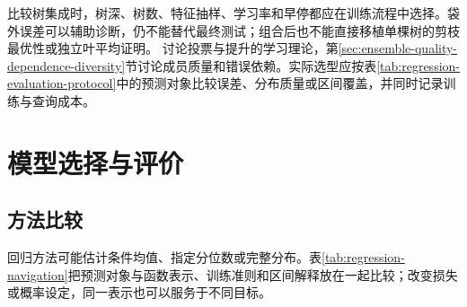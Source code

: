 比较树集成时，树深、树数、特征抽样、学习率和早停都应在训练流程中选择。袋外误差可以辅助诊断，仍不能替代最终测试；组合后也不能直接移植单棵树的剪枝最优性或独立叶平均证明。
讨论投票与提升的学习理论，第\ref{sec:ensemble-quality-dependence-diversity}节讨论成员质量和错误依赖。实际选型应按表\ref{tab:regression-evaluation-protocol}中的预测对象比较误差、分布质量或区间覆盖，并同时记录训练与查询成本。

\section{模型选择与评价}
\label{sec:regression-evaluation}

\subsection{方法比较}

回归方法可能估计条件均值、指定分位数或完整分布。表\ref{tab:regression-navigation}把预测对象与函数表示、训练准则和区间解释放在一起比较；改变损失或概率设定，同一表示也可以服务于不同目标。

